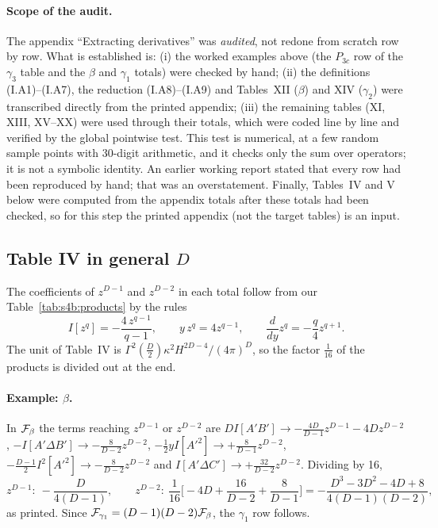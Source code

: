 \documentclass[aps,prd,onecolumn,10pt,nofootinbib,floatfix]{revtex4-2}
\newcommand{\eqI}[1]{(I.#1)}
\begin{document}
\paragraph*{Scope of the audit.}
The appendix ``Extracting derivatives'' was \emph{audited}, not redone from scratch row by row. What is
established is: (i) the worked examples above (the $P_{3c}$ row of the $\gamma_3$ table and the $\beta$ and $\gamma_1$
totals) were checked by hand; (ii) the definitions \eqI{A1}--\eqI{A7}, the reduction \eqI{A8}--\eqI{A9} and Tables~XII ($\beta$) and XIV
($\gamma_2$) were transcribed directly from the printed appendix; (iii) the remaining tables (XI, XIII, XV--XX) were used
through their totals, which were coded line by line and verified by the global pointwise test. This test is
numerical, at a few random sample points with 30-digit arithmetic, and it checks only the sum over operators; it is not
a symbolic identity. An earlier working report stated that every row had been reproduced by hand; that was an
overstatement. Finally, Tables~IV and V below were computed from the appendix totals after these totals had been
checked, so for this step the printed appendix (not the target tables) is an input.

\subsection{Table IV in general \texorpdfstring{$D$}{D}}
\label{sec:s4b:tableIV}

The coefficients of $z^{D-1}$ and $z^{D-2}$ in each total follow from our Table~\ref{tab:s4b:products} by the rules
\begin{equation}
I[z^q]=-\frac{4\,z^{q-1}}{q-1},\qquad y\,z^q=4z^{q-1},\qquad \frac{d}{dy}z^q=-\frac q4z^{q+1}.
\label{eq:s4b:rules}
\end{equation}
The unit of Table~IV is $\Gamma^2(\frac D2)\kappa^2H^{2D-4}/(4\pi)^D$, so the factor $\frac1{16}$ of the products is
divided out at the end.

\paragraph*{Example: $\beta$.}
In $\mathcal{F}_\beta$ the terms reaching $z^{D-1}$ or $z^{D-2}$ are $DI[A'B']\to-\frac{4D}{D-1}z^{D-1}-4Dz^{D-2}$,
$-I[A'\Delta B']\to-\frac{8}{D-2}z^{D-2}$, $-\frac12yI[A'^2]\to+\frac{8}{D-1}z^{D-2}$,
$-\frac{D-1}{2}I^2[A'^2]\to-\frac{8}{D-2}z^{D-2}$ and $I[A'\Delta C']\to+\frac{32}{D-2}z^{D-2}$. Dividing by 16,
\begin{equation}
z^{D-1}:\ -\frac{D}{4(D-1)},\qquad
z^{D-2}:\ \frac1{16}\Big[-4D+\frac{16}{D-2}+\frac{8}{D-1}\Big]=-\frac{D^3-3D^2-4D+8}{4(D-1)(D-2)},
\end{equation}
as printed. Since $\mathcal{F}_{\gamma_1}=(D-1)(D-2)\mathcal{F}_\beta$, the $\gamma_1$ row follows.
\end{document}

